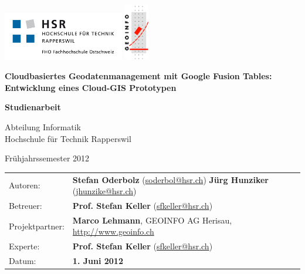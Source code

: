 \begin{titlepage}

\includegraphics[width=200px]{images/titlepage/logo-hsr}
\hfill
\includegraphics[width=40px]{images/titlepage/logo-geoinfo}
\vspace{2.2cm}

\begin{center}
{ \Large
	\textbf{Cloudbasiertes Geodatenmanagement mit Google Fusion Tables: Entwicklung eines Cloud-GIS Prototypen}
	\vspace{1cm}

	\textbf{Studienarbeit}
	\vspace{1cm}

	Abteilung Informatik \\[0.2cm]
	Hochschule für Technik Rapperswil
	\vspace{1cm}

	Frühjahrssemester 2012
}
\end{center}
\vspace{2.3cm}

\begin{tabular}{p{0.19\twocelltabwidth}p{0.81\twocelltabwidth}}
Autoren: & \textbf{Stefan Oderbolz} (\url{soderbol@hsr.ch}) \newline
 \textbf{Jürg Hunziker} (\url{jhunzike@hsr.ch}) \\ 
Betreuer: & \textbf{Prof. Stefan Keller} (\url{sfkeller@hsr.ch}) \\ 
Projektpartner: & \textbf{Marco Lehmann}, GEOINFO AG Herisau, \url{http://www.geoinfo.ch} \\ 
Experte: & \textbf{Prof. Stefan Keller} (\url{sfkeller@hsr.ch}) \\ 
Datum: & \textbf{1. Juni 2012} \\ 
\end{tabular}

\end{titlepage}